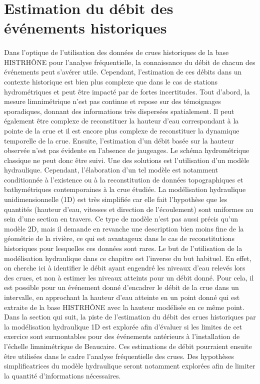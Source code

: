 \documentclass[11pt]{article}
\begin{document}
\FloatBarrier

\section{Estimation du débit des événements historiques}
\label{sec:hydraul}
	\paragraph{} Dans l'optique de l'utilisation des données de crues historiques de la base HISTRHÔNE pour l'analyse fréquentielle, la connaissance du débit de chacun des événements peut s'avérer utile. Cependant, l'estimation de ces débits dans un contexte historique est bien plus complexe que dans le cas de stations hydrométriques et peut être impacté par de fortes incertitudes. Tout d'abord, la mesure limnimétrique n'est pas continue et repose sur des témoignages sporadiques, donnant des informations très dispersées spatialement. Il peut également être complexe de reconstituer la hauteur d'eau correspondant à la pointe de la crue et il est encore plus complexe de reconstituer la dynamique temporelle de la crue. Ensuite, l'estimation d'un débit basée sur la hauteur observée n'est pas évidente en l'absence de jaugeages. Le schéma hydrométrique classique ne peut donc être suivi. Une des solutions est l'utilisation d'un modèle hydraulique. Cependant, l'élaboration d'un tel modèle est notamment conditionnée à l'existence ou à la reconstitution de données topographiques et bathymétriques contemporaines à la crue étudiée. La modélisation hydraulique unidimensionnelle (1D) est très simplifiée car elle fait l'hypothèse que les quantités (hauteur d'eau, vitesses et direction de l'écoulement) sont uniformes au sein d'une section en travers. Ce type de modèle n'est pas aussi précis qu'un modèle 2D, mais il demande en revanche une description bien moins fine de la géométrie de la rivière, ce qui est avantageux dans le cas de reconstitutions historiques pour lesquelles ces données sont rares. Le but de l'utilisation de la modélisation hydraulique dans ce chapitre est l'inverse du but habituel. En effet, on cherche ici à identifier le débit ayant engendré les niveaux d'eau relevés lors des crues, et non à estimer les niveaux atteints pour un débit donné. Pour cela, il est possible pour un événement donné d'encadrer le débit de la crue dans un intervalle, en approchant la hauteur d'eau atteinte en un point donné qui est extraite de la base HISTRHÔNE avec la hauteur modélisée en ce même point. Dans la section qui suit, la piste de l'estimation du débit des crues historiques par la modélisation hydraulique 1D est explorée afin d'évaluer si les limites de cet exercice sont surmontables pour des événements antérieurs à l'installation de l'échelle limnimétrique de Beaucaire. Ces estimations de débit pourraient ensuite être utilisées dans le cadre l'analyse fréquentielle des crues. Des hypothèses simplificatrices du modèle hydraulique seront notamment explorées afin de limiter la quantité d'informations nécessaires.
\end{document}
